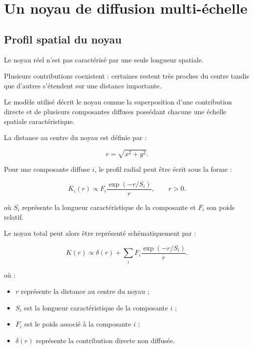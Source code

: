 \documentclass[11pt,a4paper]{report}
\begin{document}


\chapter{Un noyau de diffusion multi-échelle}

\section{Profil spatial du noyau}

Le noyau réel n'est pas caractérisé par une seule longueur spatiale.

Plusieurs contributions coexistent : certaines restent très proches du
centre tandis que d'autres s'étendent sur une distance importante.

Le modèle utilisé décrit le noyau comme la superposition d'une contribution
directe et de plusieurs composantes diffuses possédant chacune une échelle
spatiale caractéristique.

La distance au centre du noyau est définie par :

\begin{equation}
r
=
\sqrt{x^2+y^2}.
\label{eq:radial_distance}
\end{equation}

Pour une composante diffuse $i$, le profil radial peut être écrit sous la
forme :

\begin{equation}
K_i(r)
\propto
F_i
\frac{\exp(-r/S_i)}{r},
\qquad r>0.
\label{eq:kernel_component}
\end{equation}

où $S_i$ représente la longueur caractéristique de la composante et $F_i$
son poids relatif.

Le noyau total peut alors être représenté schématiquement par :

\begin{equation}
K(r)
\propto
\delta(r)
+
\sum_i
F_i
\frac{\exp(-r/S_i)}{r}.
\label{eq:kernel_real}
\end{equation}

où :

\begin{itemize}

    \item $r$ représente la distance au centre du noyau ;

    \item $S_i$ est la longueur caractéristique de la composante $i$ ;

    \item $F_i$ est le poids associé à la composante $i$ ;

    \item $\delta(r)$ représente la contribution directe non diffusée.

\end{itemize}
\end{document}
